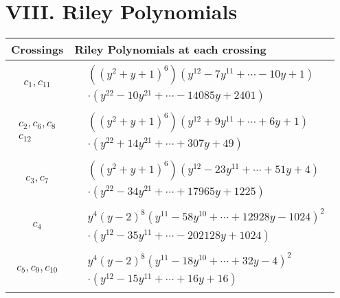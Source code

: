 \documentclass[1p]{elsarticle_modified}
\theoremstyle{definition}
\begin{document}
\centering \section*{ VIII. Riley Polynomials}
\begin{tabular}{m{50pt}|m{274pt}}
Crossings & \hspace{64pt}Riley Polynomials at each crossing \\
\hline $$\begin{aligned}c_{1},c_{11}\end{aligned}$$&$\begin{aligned}
&((y^2+y+1)^6)(y^{12}-7 y^{11}+\cdots-10 y+1)\\
&\cdot(y^{22}-10 y^{21}+\cdots-14085 y+2401)
\end{aligned}$\\
\hline $$\begin{aligned}c_{2},c_{6},c_{8}\\c_{12}\end{aligned}$$&$\begin{aligned}
&((y^2+y+1)^6)(y^{12}+9 y^{11}+\cdots+6 y+1)\\
&\cdot(y^{22}+14 y^{21}+\cdots+307 y+49)
\end{aligned}$\\
\hline $$\begin{aligned}c_{3},c_{7}\end{aligned}$$&$\begin{aligned}
&((y^2+y+1)^6)(y^{12}-23 y^{11}+\cdots+51 y+4)\\
&\cdot(y^{22}-34 y^{21}+\cdots+17965 y+1225)
\end{aligned}$\\
\hline $$\begin{aligned}c_{4}\end{aligned}$$&$\begin{aligned}
&y^4(y-2)^8(y^{11}-58 y^{10}+\cdots+12928 y-1024)^{2}\\
&\cdot(y^{12}-35 y^{11}+\cdots-202128 y+1024)
\end{aligned}$\\
\hline $$\begin{aligned}c_{5},c_{9},c_{10}\end{aligned}$$&$\begin{aligned}
&y^4(y-2)^8(y^{11}-18 y^{10}+\cdots+32 y-4)^{2}\\
&\cdot(y^{12}-15 y^{11}+\cdots+16 y+16)
\end{aligned}$\\
\hline
\end{tabular}
\vskip 2pc
\end{document}
